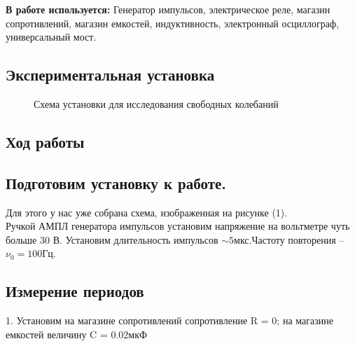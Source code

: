 \documentclass[a4paper,12pt]{article} %
\begin{document}
\textbf{В работе используется:} Генератор импульсов, электрическое реле, магазин сопротивлений, магазин емкостей, индуктивность, электронный осциллограф, универсальный мост.

\begin{center}
\section{Экспериментальная установка}
\end{center}

\begin{figure}[h]\label{ustanovka}
	\caption{Схема установки для исследования свободных колебаний}
\label{fig:image}
\end{figure}

\begin{center}
\section{Ход работы}
\end{center}


\subsection{Подготовим установку к работе.}

Для этого у нас уже собрана схема, изображенная на рисунке (1).\\
Ручкой АМПЛ генератора импульсов установим напряжение на вольтметре чуть больше 30 В. Установим длительность импульсов $\sim 5$мкс.Частоту повторения -- $\nu_0 = 100$Гц.

\subsection{Измерение периодов}

1. Установим на магазине сопротивлений сопротивление R = 0; на магазине емкостей величину C = 0.02мкФ\\
\end{document}
